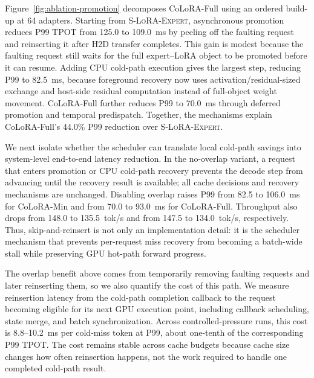 \documentclass[sigplan,anonymous,review,10pt]{acmart}
\begin{document}
Figure~\ref{fig:ablation-promotion} decomposes CoLoRA-Full using an ordered build-up at 64 adapters. Starting from \textsc{S-LoRA-Expert}, asynchronous promotion reduces P99 TPOT from 125.0 to 109.0~ms by peeling off the faulting request and reinserting it after H2D transfer completes. This gain is modest because the faulting request still waits for the full expert--LoRA object to be promoted before it can resume. Adding CPU cold-path execution gives the largest step, reducing P99 to 82.5~ms, because foreground recovery now uses activation/residual-sized exchange and host-side residual computation instead of full-object weight movement. CoLoRA-Full further reduces P99 to 70.0~ms through deferred promotion and temporal predispatch. Together, the mechanisms explain CoLoRA-Full's 44.0\% P99 reduction over \textsc{S-LoRA-Expert}.


We next isolate whether the scheduler can translate local cold-path savings into system-level end-to-end latency reduction. In the no-overlap variant, a request that enters promotion or CPU cold-path recovery prevents the decode step from advancing until the recovery result is available; all cache decisions and recovery mechanisms are unchanged. Disabling overlap raises P99 from 82.5 to 106.0~ms for CoLoRA-Min and from 70.0 to 93.0~ms for CoLoRA-Full. Throughput also drops from 148.0 to 135.5~tok/s and from 147.5 to 134.0~tok/s, respectively. Thus, skip-and-reinsert is not only an implementation detail: it is the scheduler mechanism that prevents per-request miss recovery from becoming a batch-wide stall while preserving GPU hot-path forward progress.

The overlap benefit above comes from temporarily removing faulting requests and later reinserting them, so we also quantify the cost of this path. We measure reinsertion latency from the cold-path completion callback to the request becoming eligible for its next GPU execution point, including callback scheduling, state merge, and batch synchronization. Across controlled-pressure runs, this cost is 8.8--10.2~ms per cold-miss token at P99, about one-tenth of the corresponding P99 TPOT. The cost remains stable across cache budgets because cache size changes how often reinsertion happens, not the work required to handle one completed cold-path result.
\end{document}
